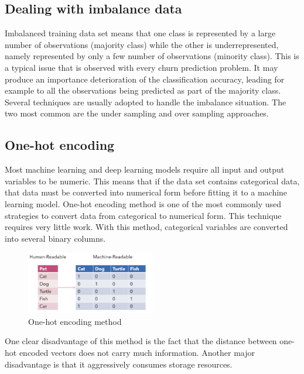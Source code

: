 \documentclass[LaM,binding=0.6cm, english]{sapthesis}
\begin{document}
\subsection{Dealing with imbalance data} \label{imbalance_data}

Imbalanced training data set means that one class is represented by a large number of observations (majority class) while the other is underrepresented, namely represented by only a few number of observations (minority class). This is a typical issue that is observed with every churn prediction problem. It may produce an importance deterioration of the classification accuracy, leading for example to all the observations being predicted as part of the majority class. Several techniques are usually adopted to handle the imbalance situation. The two most common are the under sampling and over sampling approaches.\cite{Barandela2004}

\subsection{One-hot encoding} \label{one-hot_encoding}

Most machine learning and deep learning models require all input and output variables to be numeric. This means that if the data set contains categorical data, that data must be converted into numerical form before fitting it to a machine learning model. One-hot encoding method is one of the most commonly used strategies to convert data from categorical to numerical form. This technique requires very little work. With this method, categorical variables are converted into several binary columns.

\begin{figure}[!ht]
    \includegraphics[width=0.5\textwidth]{images/One-hot_encoding.jpg}
    \centering
    \caption{One-hot encoding method}
    \label{fig:one-hot-encoding}
\end{figure}

\par One clear disadvantage of this method is the fact that the distance between one-hot encoded vectors does not carry much information. Another major disadvantage is that it aggressively consumes storage resources.\cite{Hancock2020}
\end{document}
